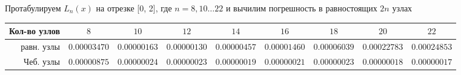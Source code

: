 Протабулируем $L_n(x)$ на отрезке [0, 2], где $n =8, 10\dots22$ и вычилим погрешность в равностоящих $2n$ узлах\\
\begin{tabular}{r|cccccccc}
\hline
Кол-во узлов&$8$&$10$&$12$&$14$&$16$&$18$&$20$&$22$\\
\hline
равн. узлы&$0.00003470$&$0.00000163$&$0.00000130$&$0.00000457$&$0.00001460$&$0.00006039$&$0.00022783$&$0.00024853$\\
Чеб. узлы&$0.00000875$&$0.00000024$&$0.00000023$&$0.00000019$&$0.00000021$&$0.00000023$&$0.00000018$&$0.00000017$\\
\end{tabular}